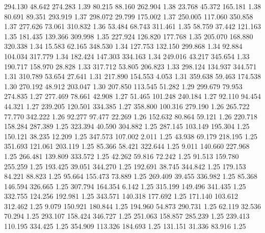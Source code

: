  294.130   48.642  274.283         1.39
  80.215   88.160  262.904         1.38
  23.768   45.372  165.181         1.38
  80.691   89.351  293.919         1.37
 298.072   29.799  175.002         1.37
 250.005  117.060  350.858         1.37
 277.626   73.061  310.832         1.36
  53.484   68.743  311.461         1.35
  58.759   37.442  121.163         1.35
 181.435  139.366  309.998         1.35
 227.924  126.820  177.768         1.35
 205.070  168.880  320.338         1.34
  15.583   62.165  348.530         1.34
 127.753  132.150  299.868         1.34
  92.884  104.034  317.779         1.34
 182.424  147.303  334.163         1.34
 249.016   43.217  345.654         1.33
 190.717  158.970   28.828         1.33
 317.712   53.805  206.823         1.33
 298.124  134.937  344.571         1.31
 310.789   53.654   27.641         1.31
 217.890  154.553    4.053         1.31
 359.638   59.463  174.538         1.30
 270.192   48.912  203.047         1.30
 207.850  113.545   51.282         1.29
 299.679   79.953  274.835         1.27
 277.469   78.661   42.908         1.27
  51.465  101.248  240.184         1.27
  92.110   94.454   44.321         1.27
 239.205  120.501  334.385         1.27
 358.800  100.316  279.190         1.26
 265.722   77.770  342.222         1.26
  92.277   97.477   22.269         1.26
 152.632   80.864   59.121         1.26
 220.718  158.284  287.389         1.25
 323.394   40.590  304.882         1.25
 287.145  103.149  195.304         1.25
 150.121   38.235   12.209         1.25
 347.573  107.002    2.011         1.25
  43.938   69.179  218.195         1.25
 351.693  121.061  203.119         1.25
  85.366   58.421  322.644         1.25
   9.011  140.660  227.968         1.25
 266.481  139.809  333.572         1.25
  42.262   59.816   72.242         1.25
  91.513  159.780  255.259         1.25
 193.425   39.051  344.270         1.25
 192.691   38.745  344.842         1.25
 179.153   84.221   88.823         1.25
  95.664  155.473   73.889         1.25
 269.409   39.455  336.982         1.25
  85.368  146.594  326.665         1.25
 307.794  164.354    6.142         1.25
 315.199  149.496  341.435         1.25
 332.755  124.256  192.981         1.25
 343.571  140.318  177.692         1.25
 171.140  103.612  312.462         1.25
   9.079  150.921  180.844         1.25
 194.960   54.873  290.731         1.25
  62.119   32.536   70.294         1.25
 293.107  158.424  346.727         1.25
 251.063  158.857  285.239         1.25
 239.413  110.195  334.425         1.25
 354.909  113.326  184.693         1.25
 131.151   31.336   83.916         1.25
